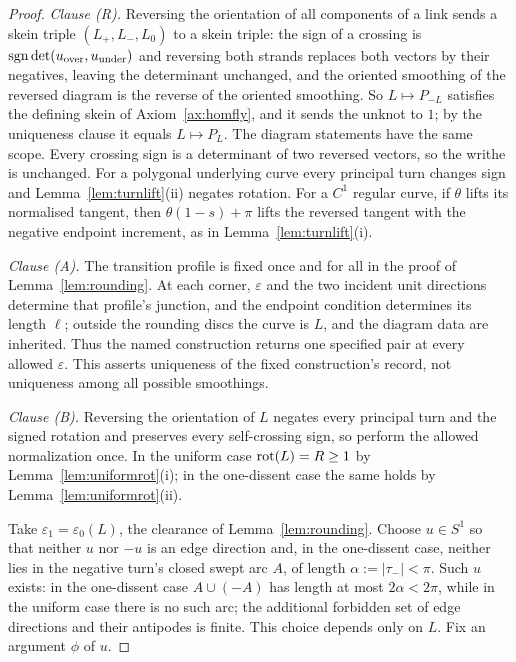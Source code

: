\begin{proof}
\emph{Clause (R).}
Reversing the orientation of all components of a link sends a skein triple
$(L_+,L_-,L_0)$ to a skein triple: the sign of a crossing is
$\operatorname{sgn}\det(u_{\mathrm{over}},u_{\mathrm{under}})$ and reversing both strands
replaces both vectors by their negatives, leaving the determinant unchanged, and
the oriented smoothing of the reversed diagram is the reverse of the oriented
smoothing. So $L\mapsto P_{-L}$ satisfies the defining skein of
Axiom~\ref{ax:homfly}, and it sends the unknot to $1$; by the uniqueness clause
it equals $L\mapsto P_L$. The diagram statements have the same scope. Every crossing sign is a
determinant of two reversed vectors, so the writhe is unchanged. For a
polygonal underlying curve every principal turn changes sign and
Lemma~\ref{lem:turnlift}(ii) negates rotation. For a $C^1$ regular curve,
if $\theta$ lifts its normalised tangent, then $\theta(1-s)+\pi$ lifts the
reversed tangent with the negative endpoint increment, as in
Lemma~\ref{lem:turnlift}(i).

\emph{Clause (A).} The transition profile is fixed once and for all in the proof of
Lemma~\ref{lem:rounding}.  At each corner, $\varepsilon$ and the two incident
unit directions determine that profile's junction, and the endpoint condition
determines its length $\ell$; outside the rounding discs the curve is $L$, and
the diagram data are inherited.  Thus the named construction returns one
specified pair at every allowed $\varepsilon$.  This asserts uniqueness of the
fixed construction's record, not uniqueness among all possible smoothings.

\emph{Clause (B).}
Reversing the orientation of $L$ negates every principal turn and the signed rotation and
preserves every self-crossing sign, so perform the allowed normalization once. In the
uniform case $\operatorname{rot}(L)=R\geq1$ by Lemma~\ref{lem:uniformrot}(i); in the one-dissent case the same holds by Lemma~\ref{lem:uniformrot}(ii).

Take $\varepsilon_1=\varepsilon_0(L)$, the clearance of Lemma~\ref{lem:rounding}.
Choose $u\in S^1$ so that neither $u$ nor $-u$ is an edge direction and, in the
one-dissent case, neither lies in the negative turn's closed swept arc $A$, of
length $\alpha:=|\tau_-|<\pi$. Such $u$ exists: in the one-dissent case $A\cup(-A)$
has length at most $2\alpha<2\pi$, while in the uniform case there is no such arc; the additional
forbidden set of edge directions and their antipodes is finite. This choice depends only on $L$. Fix an argument $\phi$ of $u$.


\end{proof}
